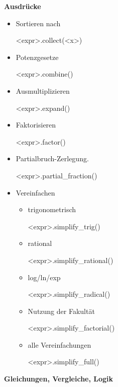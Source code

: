 \documentclass[a4paper,9pt,DIV15,twocolumn]{scrartcl}
\begin{document}
\textbf{Ausdrücke}

  \begin{itemize}
      \item Sortieren nach 
       \begin{sagein}
<expr>.collect(<x>)  
       \end{sagein}
   \item  Potenzgesetze
       \begin{sagein}
<expr>.combine() 
       \end{sagein}
   \item Ausmultiplizieren
       \begin{sagein}
<expr>.expand()  
       \end{sagein}
   \item Faktorisieren
       \begin{sagein}
<expr>.factor()  
       \end{sagein}
   \item Partialbruch-Zerlegung.
       \begin{sagein}
<expr>.partial_fraction()  
       \end{sagein}
   \item Vereinfachen
   \begin{itemize}
       \item  trigonometrisch
       \begin{sagein}
<expr>.simplify_trig() 
       \end{sagein}
        \item rational
       \begin{sagein}
<expr>.simplify\_rational() 
       \end{sagein}
        \item log/ln/exp
       \begin{sagein}
<expr>.simplify_radical() 
       \end{sagein}
        \item Nutzung der Fakultät
       \begin{sagein}
<expr>.simplify_factorial()
       \end{sagein}
        \item alle Vereinfachungen
       \begin{sagein}
<expr>.simplify_full()
       \end{sagein}
       \end{itemize}

  \end{itemize}

\textbf{Gleichungen, Vergleiche, Logik}
\end{document}

